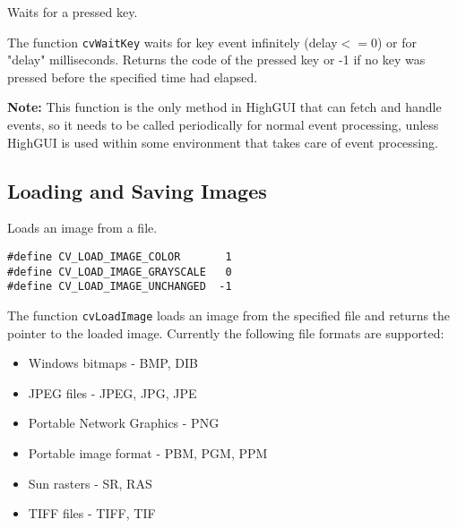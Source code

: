 
Waits for a pressed key.


\begin{description}
\end{description}

The function \texttt{cvWaitKey} waits for key event infinitely (delay$<=$0) or for "delay" milliseconds. Returns the code of the pressed key or -1 if no key was pressed before the specified time had elapsed.

\textbf{Note:} This function is the only method in HighGUI that can fetch and handle events, so it needs to be called periodically for normal event processing, unless HighGUI is used within some environment that takes care of event processing.

\subsection{Loading and Saving Images}


Loads an image from a file.


\begin{lstlisting}
#define CV_LOAD_IMAGE_COLOR       1
#define CV_LOAD_IMAGE_GRAYSCALE   0
#define CV_LOAD_IMAGE_UNCHANGED  -1
\end{lstlisting}

\begin{description}
\end{description}

The function \texttt{cvLoadImage} loads an image from the specified file and returns the pointer to the loaded image. Currently the following file formats are supported:
\begin{itemize}
\item Windows bitmaps - BMP, DIB
\item JPEG files - JPEG, JPG, JPE
\item Portable Network Graphics - PNG
\item Portable image format - PBM, PGM, PPM
\item Sun rasters - SR, RAS
\item TIFF files - TIFF, TIF
\end{itemize}

